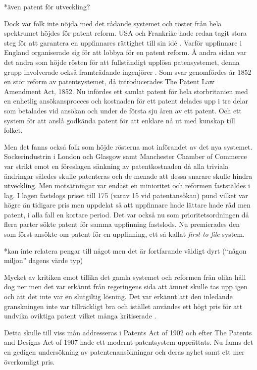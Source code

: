 *även patent för utveckling? 

Dock var folk inte nöjda med det rådande systemet och röster från hela spektrumet höjdes för patent reform. USA och Frankrike hade redan tagit stora steg för att garantera en uppfinnares rättighet till sin idé \cite{macleod}. Varför uppfinnare i England organiserade sig för att lobbya för en patent reform\cite{dutton}. Å andra sidan var det andra som höjde rösten för att fullständigt upplösa patensystemet, denna grupp involverade också framträdande ingenjörer \cite{macleod}.  
Som svar genomfördes år 1852 en stor reform av patentsystemet, då introducerades The Patent Law Amendment Act, 1852. Nu infördes ett samlat patent för hela storbritanien med en enhetlig ansökansprocces och kostnaden för ett patent delades upp i tre delar som betalades vid ansökan och under de första sju åren av ett patent. Och ett system för att anslå godkända patent för att enklare nå ut med kunskap till folket\cite{dutton}.

Men det fanns också folk som höjde rösterna mot införandet av det nya systemet. Sockerindustrin i London och Glasgow samt Manchester Chamber of Commerce var strikt emot en föreslagen sänkning av patentkostnaden då alla triviala ändringar således skulle patenteras och de menade att dessa snarare skulle hindra utveckling\cite{dutton}. Men motsätningar var endast en minioritet och reformen faststäldes i lag. I lagen fastslogs priset till 175 (varav 15 vid patentansökan) pund vilket var högre än tidigare pris men uppdelat så att uppfinnare hade lättare hade råd men patent, i alla fall en kortare period\cite{dutton}. Det var också nu som prioritetsordningen då flera parter sökte patent för samma uppfinning fastslods. Nu premierades den som först ansökte om patent för en uppfinning, ett så kallat \emph{first to file} system\cite{webster}.

*kan inte relatera pengar till något men det är fortfarande väldigt dyrt (``någon miljon'' dagens värde typ)

Mycket av kritiken emot tillika det gamla systemet och reformen från olika håll dog ner men det var erkännt från regeringens sida att ämnet skulle tas upp igen och att det inte var en slutgiltig lösning\cite{dutton}. Det var erkännt att den inledande granskningen inte var tillräckligt bra och istället användes ett högt pris för att undvika oviktiga patent vilket många kritiserade \cite{dutton}.

Detta skulle till viss mån addresseras i Patents Act of 1902 och efter The Patents 
and Designs Act of 1907 hade ett modernt patentsystem upprättats. Nu fanns det en gedigen undersökning av patentenansökningar och deras nyhet samt ett mer överkomligt pris\cite{macleod}.

